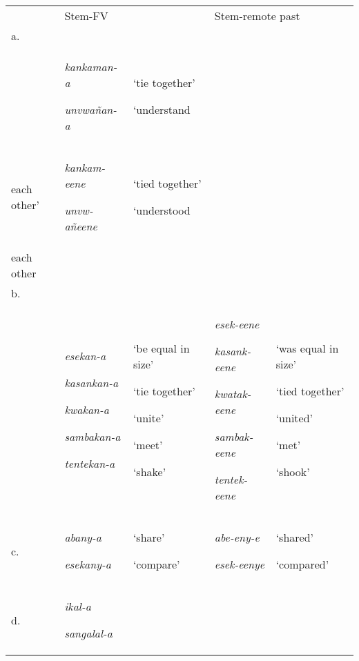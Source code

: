 \documentclass[output=paper]{langsci/langscibook}
\begin{document}
\begin{tabular}{lllll} & \multicolumn{2}{l}{\mdseries Stem-FV} & \multicolumn{2}{l}{\mdseries Stem-remote past}\\
\lsptoprule
\mdseries a. \\ & {\mdseries \emph{kankaman-a}}

\mdseries \emph{unvwañan-a} & {\mdseries ‘tie together’}

\mdseries ‘understand\\
  each other’ & {\mdseries \emph{kankam-eene}}

\mdseries \emph{unvw-añeene} & {\mdseries ‘tied together’}

\mdseries ‘understood\\
  each other\\
\mdseries b.\\ & {\mdseries \emph{esekan-a}}

{\mdseries \emph{kasankan-a}}

{\mdseries \emph{kwakan-a}}

{\mdseries \emph{sambakan-a}}

\mdseries \emph{tentekan-a} & {\mdseries ‘be equal in size’}

{\mdseries ‘tie together’}

{\mdseries ‘unite’}

{\mdseries ‘meet’}

\mdseries ‘shake’ & {\mdseries \emph{esek-eene}}

{\mdseries \emph{kasank-eene}}

{\mdseries \emph{kwatak-eene}}

{\mdseries \emph{sambak-eene}}

\mdseries \emph{tentek-eene} & {\mdseries ‘was equal in size’}

{\mdseries ‘tied together’}

{\mdseries ‘united’}

{\mdseries ‘met’}

\mdseries ‘shook’\\
\mdseries c. & {\mdseries \emph{abany-a}}

\mdseries \emph{esekany-a} & {\mdseries ‘share’}

\mdseries ‘compare’ & {\mdseries \emph{abe-eny-e}}

\mdseries \emph{esek-eenye} & {\mdseries ‘shared’}

\mdseries ‘compared’\\
\mdseries d. & {\mdseries \emph{ikal-a}}

{\mdseries \emph{sangalal-a}}


\end{tabular}
\end{document}
